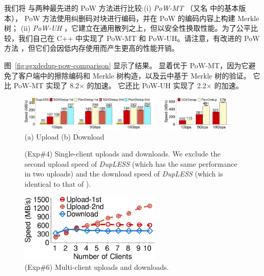 我们将 \sysnameS 与两种最先进的 PoW 方法进行比较:(i) \textit{ PoW-MT} \cite{halevi11}（又名 \cite{halevi11} 中的基本版本）， PoW 方法使用纠删码对块进行编码，并在 PoW 的编码内容上构建 Merkle 树； (ii) \textit{ PoW-UH} \cite{xu2013weak}，它建立在通用散列之上，但以安全性换取性能。为了公平比较，我们自己在 C++ 中实现了 PoW-MT 和 PoW-UH。请注意，有改进的 PoW 方法 \cite{halevi11}，但它们会因低内存使用而产生更高的性能开销。


图~\ref{fig:sgxdedup-pow-comparison} 显示了结果。 \sysnameS 显着优于 PoW-MT，因为它避免了客户端中的擦除编码和 Merkle 树构造，以及云中基于 Merkle 树的验证。 它比 PoW-MT 实现了 8.2$\times$ 的加速。 它还比 PoW-UH 实现了 2.2$\times$ 的加速。


\begin{figure}[t]
  \centering
  \includegraphics[width=0.6\textwidth]{pic/sgxdedup/upload_network_speed_bar.pdf} \ \ 
  \includegraphics[width=0.3\textwidth]{pic/sgxdedup/download_network_speed_bar.pdf}
  \vspace{-3pt}\\
    \hspace{1.1in} {\small (a) Upload} \hspace{1.9in}
  {\small (b) Download}
  \vspace{-6pt}\\
  \caption{(Exp\#4) Single-client uploads and downloads. We exclude the second upload speed of {\em DupLESS} (which has the same performance in two uploads) and the download speed of {\em DupLESS} (which is identical to that of  \sysnameS).}
  \label{fig:sgxdedup-singleClientThroughput}
\end{figure}

\begin{figure}[t]
  \centering
  \includegraphics[width=0.6\textwidth]{pic/sgxdedup/expb1_multiple_client.pdf}  
  \caption{(Exp\#6) Multi-client uploads and downloads.}
  \label{fig:sgxdedup-multiClientThroughput}
\end{figure}


